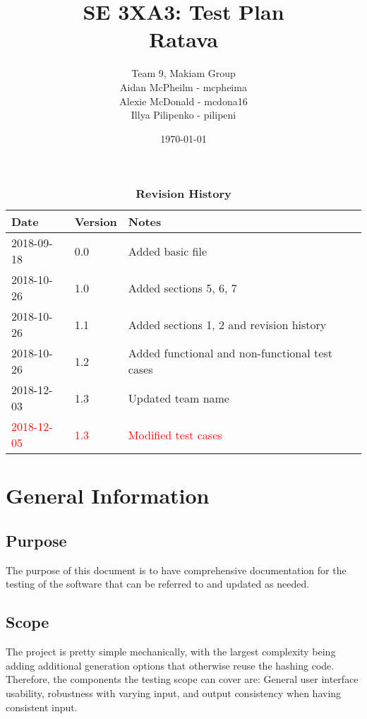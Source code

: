 \documentclass[12pt, titlepage]{article}
\title{SE 3XA3: Test Plan\\Ratava}
\author{Team 9, Makiam Group
    \\ Aidan McPheilm - mcpheima
		\\ Alexie McDonald - mcdona16
		\\ Illya Pilipenko  - pilipeni
}
\date{\today}
\begin{document}

\maketitle

\tableofcontents
\listoftables
\listoffigures

\begin{table}[bp]
\caption{\bf Revision History}
\begin{tabularx}{\textwidth}{p{3cm}p{2cm}X}
\hline
{\bf Date} & {\bf Version} & {\bf Notes}\\
\hline
2018-09-18 & 0.0 & Added basic file\\
2018-10-26 & 1.0 & Added sections 5, 6, 7\\
2018-10-26 & 1.1 & Added sections 1, 2 and revision history\\
2018-10-26 & 1.2 & Added functional and non-functional test cases\\
2018-12-03 & 1.3 & Updated team name\\
\textcolor{red}{2018-12-05} & \textcolor{red}{1.3} & \textcolor{red}{Modified test cases}\\
\hline
\end{tabularx}
\end{table}

\newpage


\section{General Information}

\subsection{Purpose}
The purpose of this document is to have comprehensive documentation for the testing of
the software that can be referred to and updated as needed.

\subsection{Scope}
The project is pretty simple mechanically, with the largest complexity being adding additional generation
options that otherwise reuse the hashing code. Therefore, the components the testing scope can cover are:
 General user interface usability, robustness with varying input, and output consistency when having consistent
 input.
\end{document}
